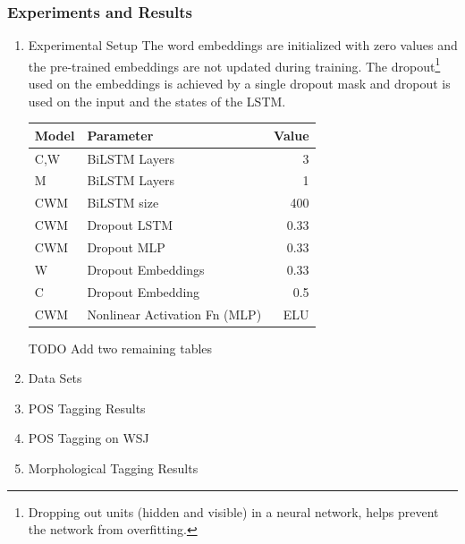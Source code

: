 \documentclass[11pt]{article}
\begin{document}
\subsubsection{Experiments and Results}
\label{sec:orgf78b039}
\begin{enumerate}
\item Experimental Setup
\label{sec:orgfbe1c38}
The word embeddings are initialized with zero values and the pre-trained embeddings are not updated during training. The dropout\footnote{Dropping out units (hidden and visible) in a neural network, helps prevent the network from overfitting.} used on the embeddings is achieved by a single dropout mask and dropout is used on the input and the states of the LSTM.

\begin{table}[htbp]
\label{Architecture}
\centering
\begin{tabular}{llr}
Model & Parameter & Value\\
\hline
C,W & BiLSTM Layers & 3\\
M & BiLSTM Layers & 1\\
CWM & BiLSTM size & 400\\
CWM & Dropout LSTM & 0.33\\
CWM & Dropout MLP & 0.33\\
W & Dropout Embeddings & 0.33\\
C & Dropout Embedding & 0.5\\
CWM & Nonlinear Activation Fn (MLP) & ELU\\
\end{tabular}
\end{table}

TODO Add two remaining tables
\item Data Sets
\label{sec:org78e1783}
\item POS Tagging Results
\label{sec:org40f21d0}
\item POS Tagging on WSJ
\label{sec:org8018b89}
\item Morphological Tagging Results
\label{sec:orga971ce1}
\end{enumerate}
\end{document}
